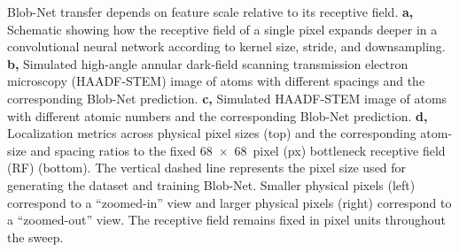 \caption[Blob-Net transfer depends on feature scale relative to its receptive field]{Blob-Net transfer depends on feature scale relative to its receptive field. \textbf{a,} Schematic showing how the receptive field of a single pixel expands deeper in a convolutional neural network according to kernel size, stride, and downsampling. \textbf{b,} Simulated high-angle annular dark-field scanning transmission electron microscopy (HAADF-STEM) image of atoms with different spacings and the corresponding Blob-Net prediction. \textbf{c,} Simulated HAADF-STEM image of atoms with different atomic numbers and the corresponding Blob-Net prediction. \textbf{d,} Localization metrics across physical pixel sizes (top) and the corresponding atom-size and spacing ratios to the fixed 68~$\times$~68~pixel (px) bottleneck receptive field (RF) (bottom). The vertical dashed line represents the pixel size used for generating the dataset and training Blob-Net. Smaller physical pixels (left) correspond to a ``zoomed-in'' view and larger physical pixels (right) correspond to a ``zoomed-out'' view. The receptive field remains fixed in pixel units throughout the sweep.}
